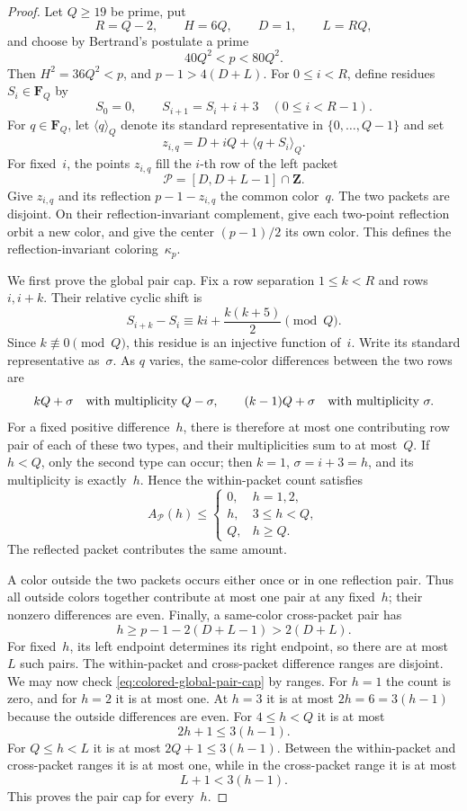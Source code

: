 \begin{proof}
Let $Q\ge19$ be prime, put
\[
 R=Q-2,\qquad H=6Q,\qquad D=1,\qquad L=RQ,
\]
and choose by Bertrand's postulate a prime
\[
 40Q^2<p<80Q^2.
\]
Then $H^2=36Q^2<p$, and
$p-1>4(D+L)$.  For $0\le i<R$, define residues
$S_i\in\mathbf F_Q$ by
\[
 S_0=0,\qquad S_{i+1}=S_i+i+3
 \quad(0\le i<R-1).
\]
For $q\in\mathbf F_Q$, let $\langle q\rangle_Q$ denote its standard
representative in $\{0,\ldots,Q-1\}$ and set
\[
 z_{i,q}=D+iQ+\langle q+S_i\rangle_Q.
\]
For fixed~$i$, the points $z_{i,q}$ fill the $i$-th row of the left
packet
\[
 \mathcal P=[D,D+L-1]\cap\mathbf Z.
\]
Give $z_{i,q}$ and its reflection $p-1-z_{i,q}$ the common color~$q$.
The two packets are disjoint.  On their reflection-invariant complement,
give each two-point reflection orbit a new color, and give the center
$(p-1)/2$ its own color.  This defines the reflection-invariant
coloring~$\kappa_p$.

We first prove the global pair cap.  Fix a row separation
$1\le k<R$ and rows $i,i+k$.  Their relative cyclic shift is
\[
 S_{i+k}-S_i
 \equiv ki+\frac{k(k+5)}2\pmod Q.
\]
Since $k\not\equiv0\pmod Q$, this residue is an injective function of~$i$.
Write its standard representative as~$\sigma$.  As $q$ varies, the
same-color differences between the two rows are
\[
 kQ+\sigma\quad\hbox{with multiplicity }Q-\sigma,
 \qquad
 (k-1)Q+\sigma\quad\hbox{with multiplicity }\sigma.
\]
For a fixed positive difference~$h$, there is therefore at most one
contributing row pair of each of these two types, and their multiplicities
sum to at most~$Q$.  If $h<Q$, only the second type can occur; then
$k=1$, $\sigma=i+3=h$, and its multiplicity is exactly~$h$.  Hence the
within-packet count satisfies
\begin{equation}
 A_{\mathcal P}(h)\le
 \begin{cases}
 0,&h=1,2,\\
 h,&3\le h<Q,\\
 Q,&h\ge Q.
 \end{cases}
\label{eq:colored-one-packet-cap}
\end{equation}
The reflected packet contributes the same amount.

A color outside the two packets occurs either once or in one reflection
pair.  Thus all outside colors together contribute at most one pair at
any fixed~$h$; their nonzero differences are even.  Finally, a same-color
cross-packet pair has
\[
 h\ge p-1-2(D+L-1)>2(D+L).
\]
For fixed~$h$, its left endpoint determines its right endpoint, so there
are at most $L$ such pairs.  The within-packet and cross-packet difference
ranges are disjoint.  We may now check
\eqref{eq:colored-global-pair-cap} by ranges.  For $h=1$ the count is
zero, and for $h=2$ it is at most one.  At $h=3$ it is at most
$2h=6=3(h-1)$ because the outside differences are even.  For
$4\le h<Q$ it is at most
\[
 2h+1\le3(h-1).
\]
For $Q\le h<L$ it is at most
$2Q+1\le3(h-1)$.  Between the within-packet and cross-packet ranges it is
at most one, while in the cross-packet range it is at most
\[
 L+1<3(h-1).
\]
This proves the pair cap for every~$h$.


\end{proof}
